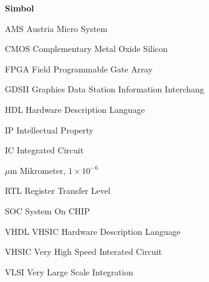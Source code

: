 	\vspace{1cm}
	\noindent \begin{large}\textbf{Simbol}\end{large}
	\begin{abbreviations}
		\item[AMS] Austria Micro System
		\item[CMOS] Complementary Metal Oxide Silicon
		\item[FPGA] Field Programmable Gate Array
		\item[GDSII] Graphics Data Station Information Interchang
		\item[HDL] Hardware Description Language
		\item[IP] Intellectual Property
		\item[IC] Integrated Circuit
		\item[$\mu$m] Mikrometer, $1 \times 10^{-6}$
		\item[RTL] Register Transfer Level
		\item[SOC] System On CHIP
		\item[VHDL] VHSIC Hardware Description Language
		\item[VHSIC] Very High Speed Interated Circuit
		\item[VLSI] Very Large Scale Integration
	\end{abbreviations}